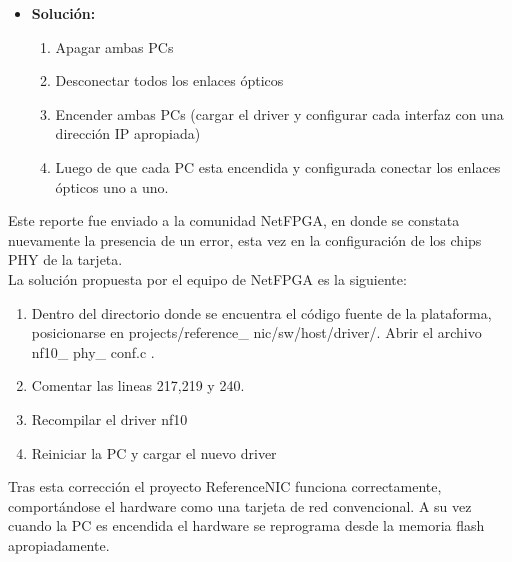 \begin{itemize}
\item \textbf{Soluci\'on:}
\begin{enumerate}
\item Apagar ambas PCs
\item Desconectar todos los enlaces \'opticos
\item Encender ambas PCs (cargar el driver y configurar cada interfaz con una direcci\'on IP apropiada)
\item Luego de que cada PC esta encendida y configurada conectar los enlaces \'opticos uno a uno.
\end{enumerate}

\end{itemize}

Este reporte fue enviado a la comunidad NetFPGA, en donde se constata nuevamente la presencia de un error, esta vez en la configuraci\'on de los chips PHY de la tarjeta.\\ 

La soluci\'on propuesta por el equipo de NetFPGA es la siguiente:

\begin{enumerate}
\item Dentro del directorio donde se encuentra el c\'odigo fuente de la plataforma, posicionarse en 
	  projects/reference\_ nic/sw/host/driver/. Abrir el archivo nf10\_ phy\_ conf.c .
\item Comentar las lineas 217,219 y 240.
\item Recompilar el driver nf10
\item Reiniciar la PC y cargar el nuevo driver
\end{enumerate}

Tras esta correcci\'on el proyecto ReferenceNIC funciona correctamente, comportándose el hardware como una tarjeta de red convencional. A su vez cuando la PC es encendida el hardware se reprograma desde la memoria flash apropiadamente.


